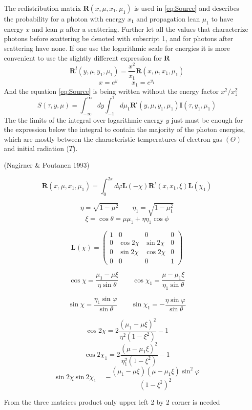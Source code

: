 \documentclass[iop, usenatbib]{emulateapj}
\newcommand{\be}{\begin{equation}}
\newcommand{\ee}{\end{equation}}
\begin{document}
The redistribution matrix $\bm{R}(x,\mu,x_1,\mu_1)$
is used in \eqref{eq:Source} and describes the probability for a photon with energy $x_1$ and propagation lean $\mu_1$ to have energy $x$ 
and lean $\mu$ after a scattering.  
Further let all the values that characterize photons before scattering be denoted with subscript 1,
and for photons after scattering have none. 
If one use the logarithmic scale for energies it is more convenient to use the slightly different expression for $\bm{R}$  
$$
\bm{R}^l(y,\mu,y_1,\mu_1)=\frac{x^2}{x_1}\bm{R}(x,\mu,x_1,\mu_1) $$$$
x=e^y \qquad x_1=e^{y_1}
$$
And the equation \eqref{eq:Source} is being written  without the energy factor $x^2/x_1^2$ 
\be
S(\tau,y,\mu)= \int_{-\infty}^\infty dy \int_{-1}^1 d\mu_1 
\bm{R}^l(y,\mu,y_1,\mu_1)\bm{I}(\tau,y_1,\mu_1)
\ee
The the limits of the integral over logarithmic energy $y$ just must be enough 
for the expression below the integral to contain the majority of the photon energies, which are mostly between the characteristic temperatures of electron gas $(\Theta)$ and initial radiation ($T$).

(Nagirner \& Poutanen 1993)

\be
\bm{R}(x,\mu,x_1,\mu_1)=\int_0^{2\pi}d\varphi 
\bm{L}(-\chi)
\bm{R}^t(x,x_1,\xi)
\bm{L}(\chi_1)
\ee


$$
\eta=\sqrt{1-\mu^2} \qquad \eta_1=\sqrt{1-\mu_1^2}
$$
\be
\xi=\cos\theta=\mu \mu_1 + \eta \eta_1 \cos \phi
\ee

\be
\bm{L}(\chi)=
\left( {\begin{array}{cccc}
    1 & 0 & 0 & 0 \\
    0 & \cos{2\chi} & \sin{2\chi} & 0 \\
    0 & \sin{2\chi} & \cos{2\chi} & 0 \\
    0 & 0 & 0 & 1  
   \end{array} } \right)
\ee

\be
\cos\chi=\frac{\mu_1-\mu\xi}{\eta\sin\theta}
\qquad
\cos\chi_1=\frac{\mu-\mu_1\xi}{\eta_1\sin\theta}
\ee

\be
\sin\chi=\frac{\eta_1\sin\varphi}{\sin\theta}
\qquad
\sin\chi_1=-\frac{\eta\sin\varphi}{\sin\theta}
\ee


\be
\cos2\chi=2\frac{(\mu_1-\mu\xi)^2}{\eta^2(1-\xi^2)}-1
\ee
\be
\cos2\chi_1=2\frac{(\mu-\mu_1\xi)^2}{\eta_1^2(1-\xi^2)}-1
\ee
\be
\sin2\chi\sin2\chi_1=-
\frac{(\mu_1-\mu\xi)(\mu-\mu_1\xi)\sin^2\varphi}{(1-\xi^2)^2}
\ee

From the three matrices product only upper left 2 by 2 corner is needed
\end{document}
